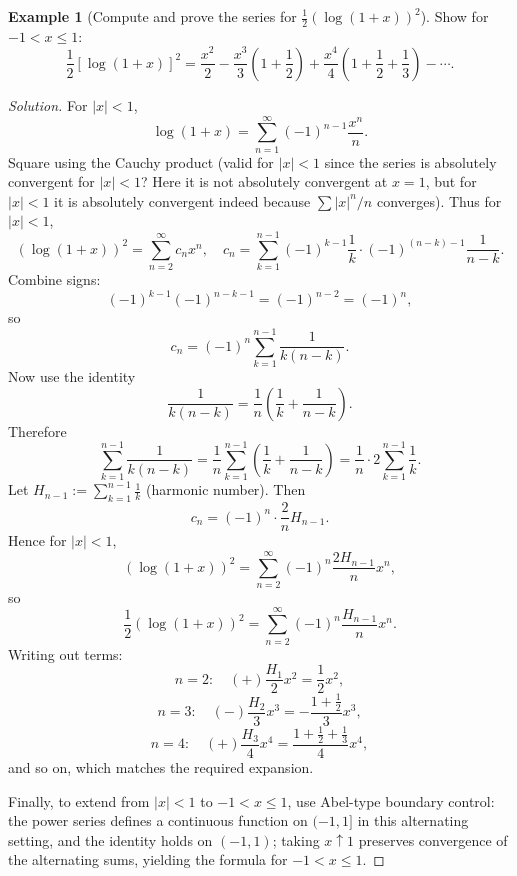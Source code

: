 \documentclass[12pt]{article}
\theoremstyle{definition}
\newtheorem{example}[theorem]{Example}
\begin{document}
\begin{example}[Compute and prove the series for $\frac12(\log(1+x))^2$]
Show for $-1<x\le 1$:
\[
\frac12[\log(1+x)]^2
= \frac{x^2}{2}
- \frac{x^3}{3}\left(1+\frac12\right)
+ \frac{x^4}{4}\left(1+\frac12+\frac13\right)
-\cdots .
\]
\end{example}

\begin{proof}[Solution]
For $|x|<1$,
\[
\log(1+x)=\sum_{n=1}^\infty (-1)^{n-1}\frac{x^n}{n}.
\]
Square using the Cauchy product (valid for $|x|<1$ since the series is absolutely convergent for $|x|<1$? 
Here it is not absolutely convergent at $x=1$, but for $|x|<1$ it is absolutely convergent indeed because
$\sum |x|^n/n$ converges). Thus for $|x|<1$,
\[
(\log(1+x))^2
= \sum_{n=2}^\infty c_n x^n,
\quad
c_n=\sum_{k=1}^{n-1} (-1)^{k-1}\frac{1}{k}\cdot (-1)^{(n-k)-1}\frac{1}{n-k}.
\]
Combine signs:
\[
(-1)^{k-1}(-1)^{n-k-1}=(-1)^{n-2}=(-1)^n,
\]
so
\[
c_n = (-1)^n \sum_{k=1}^{n-1}\frac{1}{k(n-k)}.
\]
Now use the identity
\[
\frac{1}{k(n-k)}=\frac{1}{n}\left(\frac{1}{k}+\frac{1}{n-k}\right).
\]
Therefore
\[
\sum_{k=1}^{n-1}\frac{1}{k(n-k)}
=\frac{1}{n}\sum_{k=1}^{n-1}\left(\frac{1}{k}+\frac{1}{n-k}\right)
=\frac{1}{n}\cdot 2\sum_{k=1}^{n-1}\frac{1}{k}.
\]
Let $H_{n-1}:=\sum_{k=1}^{n-1}\frac{1}{k}$ (harmonic number). Then
\[
c_n = (-1)^n \cdot \frac{2}{n}H_{n-1}.
\]
Hence for $|x|<1$,
\[
(\log(1+x))^2 = \sum_{n=2}^\infty (-1)^n \frac{2H_{n-1}}{n} x^n,
\]
so
\[
\frac12(\log(1+x))^2 = \sum_{n=2}^\infty (-1)^n \frac{H_{n-1}}{n} x^n.
\]
Writing out terms:
\[
n=2:\quad (+)\frac{H_1}{2}x^2=\frac{1}{2}x^2,
\]
\[
n=3:\quad (-)\frac{H_2}{3}x^3=-\frac{1+\frac12}{3}x^3,
\]
\[
n=4:\quad (+)\frac{H_3}{4}x^4=\frac{1+\frac12+\frac13}{4}x^4,
\]
and so on, which matches the required expansion.

Finally, to extend from $|x|<1$ to $-1<x\le 1$, use Abel-type boundary control:
the power series defines a continuous function on $(-1,1]$ in this alternating setting,
and the identity holds on $(-1,1)$; taking $x\uparrow 1$ preserves convergence of the alternating sums,
yielding the formula for $-1<x\le 1$.
\end{proof}

\end{document}
